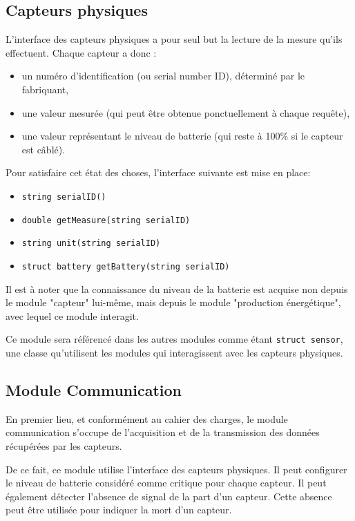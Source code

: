 \subsection{Capteurs physiques}

L'interface des capteurs physiques a pour seul but la lecture de la mesure qu'ils effectuent. Chaque capteur a donc :

\begin{itemize}
\item un numéro d'identification (ou serial number ID), déterminé par le fabriquant,
\item une valeur mesurée (qui peut être obtenue ponctuellement à chaque requête),
\item une valeur représentant le niveau de batterie (qui reste à 100\% si le capteur est câblé).
\end{itemize}

Pour satisfaire cet état des choses, l'interface suivante est mise en place:

\begin{itemize}
\item \tt{string serialID()}
\item \tt{double getMeasure(string serialID)}
\item \tt{string unit(string serialID)}
\item \tt{struct battery getBattery(string serialID)}
\end{itemize}

Il est à noter que la connaissance du niveau de la batterie est acquise non depuis le module "capteur" lui-même, mais depuis le module "production énergétique", avec lequel ce module interagit.

Ce module sera référencé dans les autres modules comme étant \texttt{struct sensor}, une classe qu'utilisent les modules qui interagissent avec les capteurs physiques.


\subsection{Module Communication}

En premier lieu, et conformément au cahier des charges, le module communication s'occupe de l'acquisition et de la transmission des données récupérées par les capteurs.

De ce fait, ce module utilise l'interface des capteurs physiques. Il peut configurer le niveau de batterie considéré comme critique pour chaque capteur. Il peut également détecter l'absence de signal de la part d'un capteur. Cette absence peut être utilisée pour indiquer la mort d'un capteur.

